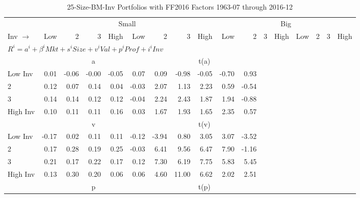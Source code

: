 
\begin{table}[!ht]
\centering
\caption{25-Size-BM-Inv Portfolios with FF2016 Factors 1963-07 through 2016-12}
\begin{tabular}{lrrrrrrrrrrrrrrrr}
  \toprule
    & \multicolumn{8}{c}{Small} & \multicolumn{8}{c}{Big} \\
      \cmidrule(r){2-9} \cmidrule(r){10-17}
    Inv $\rightarrow$ & Low & 2 & 3 & High & Low & 2 & 3 & High & Low & 2 & 3 & High & Low & 2 & 3 & High \\ 
  \midrule
  \multicolumn{11}{l}{$R^i=a^i+\beta^iMkt+s^iSize+v^iVal+p^iProf+i^iInv$} \\

  
    
      & \multicolumn{5}{c}{a} & \multicolumn{5}{c}{t(a)}
    
    \\
      \cmidrule(r){2-5} \cmidrule(r){6-9} \cmidrule(r){10-13} \cmidrule(r){14-17}

    Low Inv   & 0.01  & -0.06  & -0.00  & -0.05  & 0.07  & 0.09  & -0.98  & -0.05  & -0.70  & 0.93  \\
           2  & 0.12  & 0.07  & 0.14  & 0.04  & -0.03  & 2.07  & 1.13  & 2.23  & 0.59  & -0.54  \\
           3  & 0.14  & 0.14  & 0.12  & 0.12  & -0.04  & 2.24  & 2.43  & 1.87  & 1.94  & -0.88  \\
    High Inv  & 0.10  & 0.11  & 0.11  & 0.16  & 0.03  & 1.67  & 1.93  & 1.65  & 2.35  & 0.57  \\

  
    
      & \multicolumn{5}{c}{v} & \multicolumn{5}{c}{t(v)}
    
    \\
      \cmidrule(r){2-5} \cmidrule(r){6-9} \cmidrule(r){10-13} \cmidrule(r){14-17}

    Low Inv   & -0.17  & 0.02  & 0.11  & 0.11  & -0.12  & -3.94  & 0.80  & 3.05  & 3.07  & -3.52  \\
           2  & 0.17  & 0.28  & 0.19  & 0.25  & -0.03  & 6.41  & 9.56  & 6.47  & 7.90  & -1.16  \\
           3  & 0.21  & 0.17  & 0.22  & 0.17  & 0.12  & 7.30  & 6.19  & 7.75  & 5.83  & 5.45  \\
    High Inv  & 0.13  & 0.30  & 0.20  & 0.06  & 0.06  & 4.60  & 11.00  & 6.62  & 2.02  & 2.51  \\

  
    
      & \multicolumn{5}{c}{p} & \multicolumn{5}{c}{t(p)}
    

\end{tabular}
\end{table}
